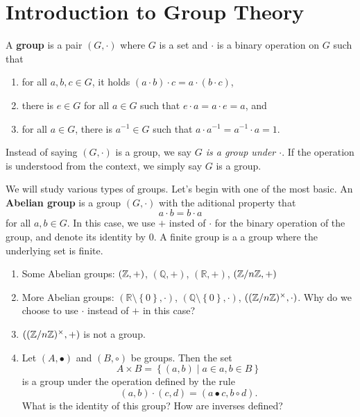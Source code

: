 \documentclass[11pt,a4paper]{article}
\begin{document}
\def\contador{Lesson 2}


\section{Introduction to Group Theory}

\begin{defi}
    A \textbf{group} is a pair  \(\left( G, \cdot \right)\) where \(G\) is a set and \(\cdot\) is a binary  operation on \(G\) such that 
    \begin{enumerate}[label=(\roman*)]
        \item for all \(a,b,c\in G\), it holds  \((a\cdot b) \cdot c = a \cdot (b\cdot c) \),
        \item there is \(e\in G\)  for all \(a\in G\) such that \(e\cdot a = a\cdot e = a\), and 
        \item for all \(a\in G\), there is \(a^{-1}\in G\) such that \(a\cdot a^{-1} = a^{-1}\cdot a = 1\).
    \end{enumerate}
\end{defi}


Instead of saying \((G,\cdot)\) is a group, we say \textit{\(G\) is a group under \(\cdot\)}.
If the operation is understood from the context, we simply say \(G\) is a group.


We will study various types of groups.
Let's begin with one of the most basic.
An \textbf{Abelian group} is a group \(\left( G, \cdot \right)\) with the aditional property that 
\[a\cdot b = b\cdot a \]
for all \(a,b\in G\).
In this case, we use \(+\) insted of \(\cdot\) for the binary operation of the group, and denote its identity by \(0\).
A finite group is a a group where the underlying set is finite.

\begin{exa}
\begin{enumerate}[label=(\roman*)]
    \item Some Abelian groups: \(\left( \mathbb{Z}, + \right)\), \(\left( \mathbb{Q}, + \right)\), \(\left( \mathbb{R}, + \right)\),   \(\left( \mathbb{Z}/n\mathbb{Z} , +\right)\)
    \item More Abelian groups: \(\left( \mathbb{R}\setminus\left\{ 0 \right\}, \cdot \right)\), \(\left( \mathbb{Q}\setminus\left\{ 0 \right\}, \cdot \right)\), \(\left( (\mathbb{Z}/n\mathbb{Z})^\times , \cdot\right)\). Why do we choose to use \(\cdot\) instead of \(+\) in this case?
    
    \item \(\left( (\mathbb{Z}/n\mathbb{Z})^\times , +\right)\) is not a group.
    \item Let \((A, \bullet)\) and \((B, \circ)\) be groups.
    Then the set 
    \[A\times B = \left\{ (a,b)\mid a\in a, b\in B \right\}\]
    is a group under the operation defined by the rule 
    \[(a,b)\cdot(c,d)  = (a\bullet c, b\circ d).\]
    What is the identity of this group? How are inverses defined?
\end{enumerate}
\end{exa}
\end{document}
